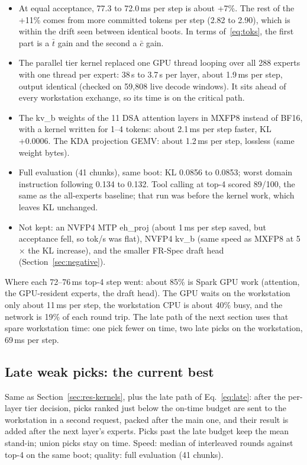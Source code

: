\documentclass[11pt]{article}
\newcommand{\ms}{\,ms}
\begin{document}
\begin{itemize}
  \item At equal acceptance, 77.3 to 72.0\ms{} per step is about +7\%. The rest of the +11\% comes from more committed
    tokens per step (2.82 to 2.90), which is within the drift seen between identical boots. In terms of~\eqref{eq:toks},
    the first part is a $\bar t$ gain and the second a $\bar c$ gain.
  \item The parallel tier kernel replaced one GPU thread looping over all 288 experts with one thread per expert:
    38\,\textmu s to 3.7\,\textmu s per layer, about 1.9\ms{} per step, output identical (checked on 59,808 live decode
    windows). It sits ahead of every workstation exchange, so its time is on the critical path.
  \item The kv\_b weights of the 11 DSA attention layers in MXFP8 instead of BF16, with a kernel written for 1--4 tokens:
    about 2.1\ms{} per step faster, KL +0.0006. The KDA projection GEMV: about 1.2\ms{} per step, lossless (same weight
    bytes).
  \item Full evaluation (41 chunks), same boot: KL 0.0856 to 0.0853; worst domain instruction following 0.134 to 0.132.
    Tool calling at top-4 scored 89/100, the same as the all-experts baseline; that run was before the kernel work,
    which leaves KL unchanged.
  \item Not kept: an NVFP4 MTP eh\_proj (about 1\ms{} per step saved, but acceptance fell, so tok/s was flat), NVFP4 kv\_b
    (same speed as MXFP8 at 5$\times$ the KL increase), and the smaller FR-Spec draft head (Section~\ref{sec:negative}).
\end{itemize}

Where each 72--76\ms{} top-4 step went: about 85\% is Spark GPU work (attention, the GPU-resident experts, the draft
head). The GPU waits on the workstation only about 11\ms{} per step, the workstation CPU is about 40\% busy, and the
network is 19\% of each round trip. The late path of the next section uses that spare workstation time: one pick fewer
on time, two late picks on the workstation, 69\ms{} per step.

\FloatBarrier
\subsection{Late weak picks: the current best}
\label{sec:res-late}
Same as Section~\ref{sec:res-kernels}, plus the late path of Eq.~\eqref{eq:late}: after the per-layer tier decision,
picks ranked just below the on-time budget are sent to the workstation in a second request, packed after the main one,
and their result is added after the next layer's experts. Picks past the late budget keep the mean stand-in; union picks
stay on time. Speed: median of interleaved rounds against top-4 on the same boot; quality: full evaluation (41 chunks).
\end{document}
